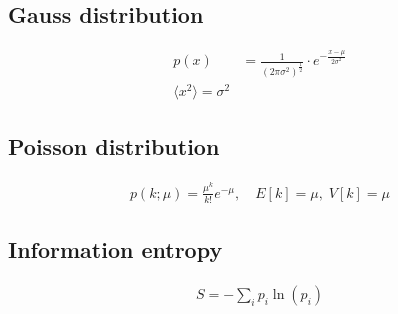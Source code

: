 \subsection*{Gauss distribution}

\begin{equation*}
    \begin{aligned}
        p(x) &= \frac{1}{\left(2 \pi \sigma^2\right)^{\frac{1}{2}}} \cdot e^{-\frac{x-\mu}{2 \sigma^2}} \\
        \langle x^2 \rangle = \sigma^2
    \end{aligned}
\end{equation*}

\subsection*{Poisson distribution}

\begin{equation*}
    \begin{aligned}
        p(k; \mu) = \frac{\mu^k}{k!} e^{- \mu}, \quad E[k] = \mu, \; V[k] = \mu
    \end{aligned}
\end{equation*}

\subsection*{Information entropy}
\begin{equation*}
    \begin{aligned}
        S = - \sum_i p_i \ln (p_i)
    \end{aligned}
\end{equation*}